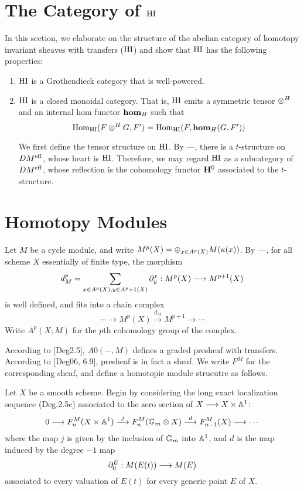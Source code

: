\section{The Category of $\HI$}

In this section, we elaborate on the structure of the abelian
category of homotopy invariant sheaves with transfers ($\HI$) and 
show that $\HI$ has the following properties:

\begin{enumerate}

\item $\HI$ is a Grothendieck category that is well-powered.

\item $\HI$ is a closed monoidal category. That is, $\HI$ 
emits a symmetric tensor $\htensor$ and an internal hom
functor $\hhom$ such that
\[
\hom_{\HI}(F \htensor G, F') = \hom_{\HI}(F, \hhom(G, F'))
\]

We first define the tensor structure on $\HI$. By ---, there
is a $t$-structure on $\DMeff$, whose heart is $\HI$. Therefore, 
we may regard $\HI$ as a subcategory of $\DMeff$, whose 
reflection is the cohomology functor $\H^0$ associated to the
$t$-structure.
\end{enumerate}

\section{Homotopy Modules}

\newcommand{\cmcohom}{A}

Let $M$ be a cycle module, and write $M^p(X) = \oplus_{x \in 
\subsch{p}{X}} M(\resf{x})$. By ---, for all scheme $X$ 
essentially of finite type, the morphism
\[
d_M^p = \sum_{x \in \subsch{p}{X}, y \in \subsch{p + 1}{X}} 
\ptres{x}{y} : M^p(X) \to M^{p + 1}(X)
\]
is well defined, and fits into a chain complex
\[
\cdots \to M^p(X) \stackrel{d_M}{\to} M^{p + 1} \to \cdots
\]
Write $\cmcohom^p(X; M)$ for the $p$th cohomology group of the 
complex.

According to [Deg2.5], $\cmcohom{0}(-,M)$ defines a graded 
presheaf with transfers. According to [Deg06, 6.9], presheaf is 
in fact a sheaf. We write $F^M$ for the corresponding sheaf, and 
define a homotopic module strucutre as follows.

Let $X$ be a smooth scheme. Begin by considering the long exact
localization sequence (Deg.2.5c) associated to the zero section of
$X \to X \times \A^1$:
\[
0 \to F^M_n(X \times \A^1) \stackrel{j}{\to} F^M_n(\Gmpt \otimes X) 
   \stackrel{d}{\to} F^M_{n - 1}(X) \to \cdots
\]
where the map $j$ is given by the inclusion of $\Gmpt$ into $\A^1$,
and $d$ is the map induced by the degree $-1$ map
\[
\ptres{E}{0}: M(E(t)) \to M(E)
\]
associated to every valuation of $E(t)$ for every generic point 
$E$ of $X$.

